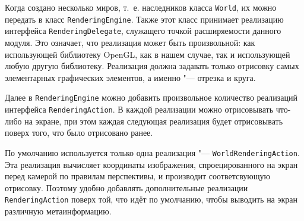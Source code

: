 Когда создано несколько миров, т.~е. наследников класса \texttt{World}, их можно передать в класс
\texttt{RenderingEngine}. Также этот класс принимает реализацию интерфейса \texttt{RenderingDelegate}, служащего точкой
расширяемости данного модуля. Это означает, что реализация может быть произвольной: как использующей библиотеку
OpenGL, как в нашем случае, так и использующей любую другую библиотеку. Реализация должна задавать только отрисовку
самых элементарных графических элементов, а именно "--- отрезка и круга.

Далее в \texttt{RenderingEngine} можно добавить произвольное количество реализаций интерфейса \texttt{RenderingAction}.
В каждой реализации можно отрисовывать что-либо на экране, при этом каждая следующая реализация будет отрисовывать
поверх того, что было отрисовано ранее.

По умолчанию используется только одна реализация "--- \texttt{WorldRenderingAc\-tion}. Эта реализация вычисляет
координаты изображения, спроецированного на экран перед камерой по правилам перспективы, и производит соответсвующую
отрисовку. Поэтому удобно добавлять дополнительные реализации \texttt{RenderingAc\-tion} поверх той, что идёт
по умолчанию, чтобы выводить на экран различную метаинформацию.
